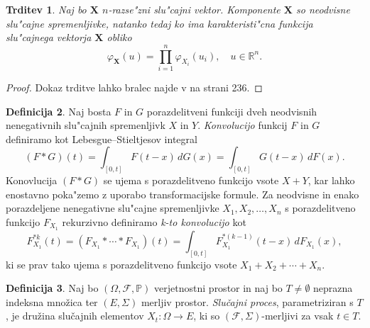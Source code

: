 \documentclass[12pt, a4paper, reqno]{amsart}
\theoremstyle{definition}
\newtheorem{definicija}{Definicija}[section]
\theoremstyle{plain}
\newtheorem{trditev}[definicija]{Trditev}
\newcommand{\R}{\mathbb{R}}
\newcommand{\1}{\mathds{1}}
\begin{document}
    \begin{trditev}
        Naj bo $\boldsymbol{X}$ $n$-razse"zni slu"cajni vektor. Komponente $\boldsymbol{X}$ so neodvisne
        slu"cajne spremenljivke, natanko tedaj ko ima karakteristi"cna funkcija slu"cajnega vektorja
        $\boldsymbol{X}$ obliko
        \begin{equation*}
            \varphi_{\boldsymbol{X}}(u) = \prod_{i=1}^n\varphi_{X_i}(u_i), \quad u\in\R^n.
        \end{equation*}
        \label{trd:karakteristicnaNeodivsnost}
    \end{trditev}

    \begin{proof}
        Dokaz trditve lahko bralec najde v \cite{7} na strani 236. 
    \end{proof}

    \begin{definicija}
        Naj bosta $F$ in $G$ porazdelitveni funkciji dveh neodvisnih nenegativnih slu"cajnih 
        spremenljivk $X$ in $Y$. \textit{Konvolucijo} funkcij $F$ in $G$ definiramo kot
        Lebesgue--Stieltjesov integral
        \begin{equation*}
            (F*G)(t) = \int_{[0, t]}F(t - x)\, dG(x) = \int_{[0, t]}G(t - x)\, dF(x).
        \end{equation*} 
        Konovlucija $(F*G)$ se ujema s porazdelitveno funkcijo vsote $X + Y$, kar lahko 
        enostavno poka"zemo z uporabo transformacijske formule.
        Za neodvisne in enako porazdeljene nenegativne slu"cajne spremenljivke $X_1, X_2, \dots, X_n$ 
        s porazdelitveno funkcijo $F_{X_1}$ rekurzivno definiramo \textit{k-to konvolucijo} kot
        \begin{equation*}
            F_{X_1}^{*k}(t) = (F_{X_1}*\cdots*F_{X_1})(t) = \int_{[0, t]}F_{X_1}^{*(k-1)}(t - x)\, dF_{X_1}(x),
        \end{equation*}
        ki se prav tako ujema s porazdelitveno funkcijo vsote $X_1 + X_2 + \cdots + X_n$. 
        \label{def:konvolucija}
    \end{definicija}

    \begin{definicija}
        Naj bo $(\Omega, \mathcal{F}, \mathbb{P})$ verjetnostni prostor in naj bo $T\neq\emptyset$
        neprazna indeksna množica ter $(E, \Sigma)$ merljiv prostor. \textit{Slučajni proces}, 
        parametriziran s $T$, je družina slučajnih elementov $X_t : \Omega \to E$,
         ki so $(\mathcal{F}, \Sigma)$-merljivi za vsak $t \in T$.
        \label{def:slucProc}
    \end{definicija}
\end{document}
